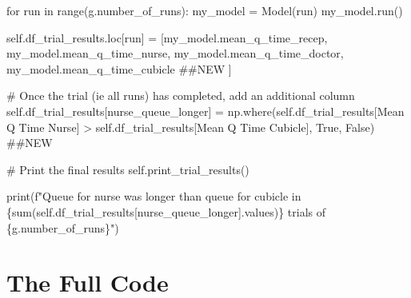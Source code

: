 \documentclass[
  letterpaper,
  DIV=11,
  numbers=noendperiod]{scrreprt}
\newenvironment{Shaded}{}{}
\newcommand{\BuiltInTok}[1]{\textcolor[rgb]{0.84,0.23,0.29}{#1}}
\newcommand{\CommentTok}[1]{\textcolor[rgb]{0.42,0.45,0.49}{#1}}
\newcommand{\ControlFlowTok}[1]{\textcolor[rgb]{0.84,0.23,0.29}{#1}}
\newcommand{\KeywordTok}[1]{\textcolor[rgb]{0.84,0.23,0.29}{#1}}
\newcommand{\NormalTok}[1]{\textcolor[rgb]{0.14,0.16,0.18}{#1}}
\newcommand{\OperatorTok}[1]{\textcolor[rgb]{0.14,0.16,0.18}{#1}}
\newcommand{\SpecialCharTok}[1]{\textcolor[rgb]{0.00,0.36,0.77}{#1}}
\newcommand{\SpecialStringTok}[1]{\textcolor[rgb]{0.01,0.18,0.38}{#1}}
\newcommand{\StringTok}[1]{\textcolor[rgb]{0.01,0.18,0.38}{#1}}
\newcommand{\VariableTok}[1]{\textcolor[rgb]{0.89,0.38,0.04}{#1}}
\begin{document}
\begin{Shaded}
\begin{Highlighting}[]
\ControlFlowTok{for}\NormalTok{ run }\KeywordTok{in} \BuiltInTok{range}\NormalTok{(g.number\_of\_runs):}
\NormalTok{    my\_model }\OperatorTok{=}\NormalTok{ Model(run)}
\NormalTok{    my\_model.run()}

    \VariableTok{self}\NormalTok{.df\_trial\_results.loc[run] }\OperatorTok{=}\NormalTok{ [my\_model.mean\_q\_time\_recep,}
\NormalTok{                                      my\_model.mean\_q\_time\_nurse,}
\NormalTok{                                      my\_model.mean\_q\_time\_doctor,}
\NormalTok{                                      my\_model.mean\_q\_time\_cubicle }\CommentTok{\#\#NEW}
\NormalTok{                                      ]}

\CommentTok{\# Once the trial (ie all runs) has completed, add an additional column}
\VariableTok{self}\NormalTok{.df\_trial\_results[}\StringTok{\textquotesingle{}nurse\_queue\_longer\textquotesingle{}}\NormalTok{] }\OperatorTok{=}\NormalTok{ np.where(}\VariableTok{self}\NormalTok{.df\_trial\_results[}\StringTok{\textquotesingle{}Mean Q Time Nurse\textquotesingle{}}\NormalTok{] }\OperatorTok{\textgreater{}} \VariableTok{self}\NormalTok{.df\_trial\_results[}\StringTok{\textquotesingle{}Mean Q Time Cubicle\textquotesingle{}}\NormalTok{], }\VariableTok{True}\NormalTok{, }\VariableTok{False}\NormalTok{) }\CommentTok{\#\#NEW}

\CommentTok{\# Print the final results}
\VariableTok{self}\NormalTok{.print\_trial\_results()}

\BuiltInTok{print}\NormalTok{(}\SpecialStringTok{f"Queue for nurse was longer than queue for cubicle in }\SpecialCharTok{\{}\BuiltInTok{sum}\NormalTok{(}\VariableTok{self}\NormalTok{.df\_trial\_results[}\StringTok{\textquotesingle{}nurse\_queue\_longer\textquotesingle{}}\NormalTok{].values)}\SpecialCharTok{\}}\SpecialStringTok{ trials of }\SpecialCharTok{\{}\NormalTok{g}\SpecialCharTok{.}\NormalTok{number\_of\_runs}\SpecialCharTok{\}}\SpecialStringTok{"}\NormalTok{)}
\end{Highlighting}
\end{Shaded}

\section{The Full Code}\label{the-full-code-9}
\end{document}
